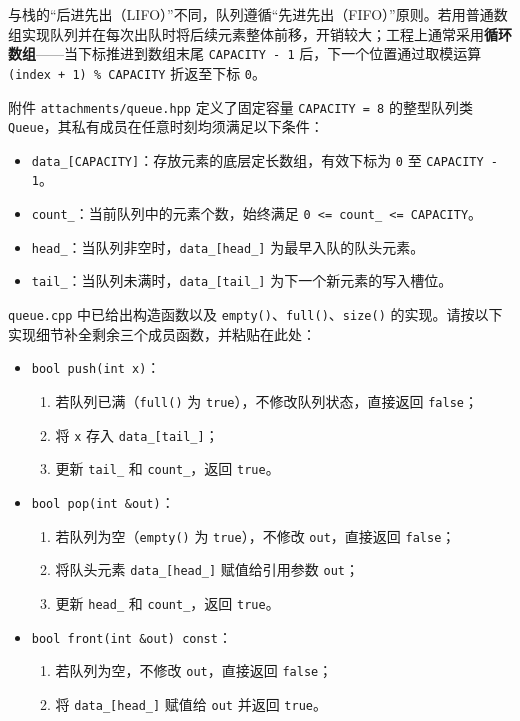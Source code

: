 \documentclass[11pt,a4paper]{ctexart}
\newenvironment{problem}[1]{%
  \vspace{0.8em}%
  \noindent{\Large\bfseries #1}\par\vspace{0.35em}%
}{\par\vspace{0.3em}}
\begin{document}
\newpage

\begin{problem}{Problem 2}
与栈的``后进先出（LIFO）''不同，队列遵循``先进先出（FIFO）''原则。若用普通数组实现队列并在每次出队时将后续元素整体前移，开销较大；工程上通常采用\textbf{循环数组}——当下标推进到数组末尾 \texttt{CAPACITY - 1} 后，下一个位置通过取模运算 \texttt{(index + 1) \% CAPACITY} 折返至下标 \texttt{0}。

\medskip
附件 \texttt{attachments/queue.hpp} 定义了固定容量 \texttt{CAPACITY = 8} 的整型队列类 \texttt{Queue}，其私有成员在任意时刻均须满足以下条件：
\begin{itemize}
  \item \texttt{data\_[CAPACITY]}：存放元素的底层定长数组，有效下标为 \texttt{0} 至 \texttt{CAPACITY - 1}。
  \item \texttt{count\_}：当前队列中的元素个数，始终满足 \texttt{0 <= count\_ <= CAPACITY}。
  \item \texttt{head\_}：当队列非空时，\texttt{data\_[head\_]} 为最早入队的队头元素。
  \item \texttt{tail\_}：当队列未满时，\texttt{data\_[tail\_]} 为下一个新元素的写入槽位。
\end{itemize}

\medskip
\texttt{queue.cpp} 中已给出构造函数以及 \texttt{empty()}、\texttt{full()}、\texttt{size()} 的实现。请按以下实现细节补全剩余三个成员函数，并粘贴在此处：
\begin{itemize}
  \item \texttt{bool push(int x)}：
  \begin{enumerate}
    \item 若队列已满（\texttt{full()} 为 \texttt{true}），不修改队列状态，直接返回 \texttt{false}；
    \item 将 \texttt{x} 存入 \texttt{data\_[tail\_]}；
    \item 更新 \texttt{tail\_} 和 \texttt{count\_}，返回 \texttt{true}。
  \end{enumerate}
  \item \texttt{bool pop(int \&out)}：
  \begin{enumerate}
    \item 若队列为空（\texttt{empty()} 为 \texttt{true}），不修改 \texttt{out}，直接返回 \texttt{false}；
    \item 将队头元素 \texttt{data\_[head\_]} 赋值给引用参数 \texttt{out}；
    \item 更新 \texttt{head\_} 和 \texttt{count\_}，返回 \texttt{true}。
  \end{enumerate}
  \item \texttt{bool front(int \&out) const}：
  \begin{enumerate}
    \item 若队列为空，不修改 \texttt{out}，直接返回 \texttt{false}；
    \item 将 \texttt{data\_[head\_]} 赋值给 \texttt{out} 并返回 \texttt{true}。
  \end{enumerate}
\end{itemize}


\end{problem}
\end{document}
